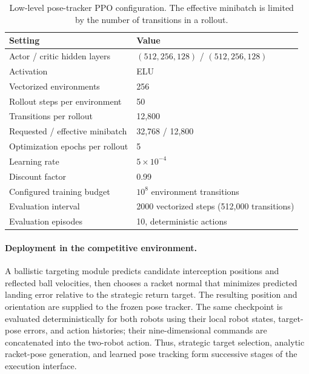 \documentclass[pmlr]{jmlr}
\begin{document}
\begin{table}[tbp]
\centering
\small
\begin{tabular}{ll}
\toprule
Setting & Value\\
\midrule
Actor / critic hidden layers & $(512,256,128)$ / $(512,256,128)$\\
Activation & ELU\\
Vectorized environments & 256\\
Rollout steps per environment & 50\\
Transitions per rollout & 12,800\\
Requested / effective minibatch & 32,768 / 12,800\\
Optimization epochs per rollout & 5\\
Learning rate & $5\times10^{-4}$\\
Discount factor & 0.99\\
Configured training budget & $10^8$ environment transitions\\
Evaluation interval & 2000 vectorized steps (512,000 transitions)\\
Evaluation episodes & 10, deterministic actions\\
\bottomrule
\end{tabular}
\caption{Low-level pose-tracker PPO configuration. The effective minibatch is limited by the number of transitions in a rollout.}
\label{tab:trackertraining}
\end{table}

\paragraph{Deployment in the competitive environment.}
A ballistic targeting module predicts candidate interception positions and reflected ball velocities, then chooses a racket normal that minimizes predicted landing error relative to the strategic return target. The resulting position and orientation are supplied to the frozen pose tracker. The same checkpoint is evaluated deterministically for both robots using their local robot states, target-pose errors, and action histories; their nine-dimensional commands are concatenated into the two-robot action. Thus, strategic target selection, analytic racket-pose generation, and learned pose tracking form successive stages of the execution interface.
\end{document}
